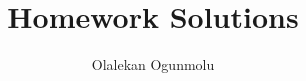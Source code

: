 \documentclass[letterpaper, 10 pt, journal, twoside]{IEEEtran}
\theoremstyle{remark}
\begin{document}
	
	
	\title{Homework Solutions}
	
	\author{Olalekan Ogunmolu}



\providecommand\BIBentryALTinterwordstretchfactor{2.5}

	
\end{document}
